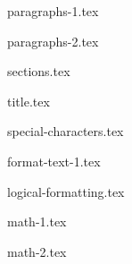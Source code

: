 \documentclass[allauthors,dutch]{../../../cursuspresentatie}
\def\importslide#1#2{%
	{#2}
}
\begin{document}
\importslide{beginners_NL}{paragraphs-1.tex}

\importslide{beginners_NL}{paragraphs-2.tex}


\importslide{beginners_NL}{sections.tex}


\importslide{beginners_NL}{title.tex}


\importslide{beginners_NL}{special-characters.tex}


\importslide{beginners_NL}{format-text-1.tex}

\importslide{beginners_NL}{logical-formatting.tex}



\importslide{beginners_NL}{math-1.tex}

\importslide{beginners_NL}{math-2.tex}

\end{document}
